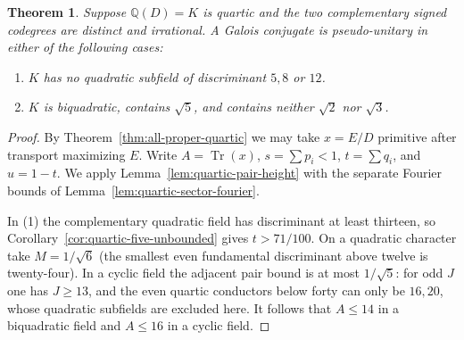 \documentclass[11pt,reqno]{amsart}
\newtheorem{theorem}{Theorem}[section]
\theoremstyle{remark}\newtheorem{remark}[theorem]{Remark}
\numberwithin{equation}{section}
\begin{document}
\begin{theorem}\label{thm:quartic-high-quadratic}
Suppose $\mathbb Q(D)=K$ is quartic and the two complementary signed codegrees are distinct and irrational. A Galois conjugate is pseudo-unitary in either of the following cases:
\begin{enumerate}
\item $K$ has no quadratic subfield of discriminant $5,8$ or $12$.
\item $K$ is biquadratic, contains $\sqrt5$, and contains neither $\sqrt2$ nor $\sqrt3$.
\end{enumerate}
\end{theorem}
\begin{proof}
By Theorem~\ref{thm:all-proper-quartic} we may take $x=E/D$ primitive after transport maximizing $E$. Write $A=\operatorname{Tr}(x)$, $s=\sum p_i<1$, $t=\sum q_i$, and $u=1-t$. We apply Lemma~\ref{lem:quartic-pair-height} with the separate Fourier
bounds of Lemma~\ref{lem:quartic-sector-fourier}.

In (1) the complementary quadratic field has discriminant at least thirteen, so Corollary~\ref{cor:quartic-five-unbounded} gives $t>71/100$. On a quadratic character take $M=1/\sqrt6$ (the smallest even fundamental discriminant above twelve is twenty-four). In a cyclic field the adjacent pair bound is at most $1/\sqrt5$: for odd $J$ one has $J\ge13$, and the even quartic conductors below forty can only be $16,20$, whose quadratic subfields are excluded here. It follows that $A\le14$ in a biquadratic field and $A\le16$ in a cyclic field.


\end{proof}
\end{document}
